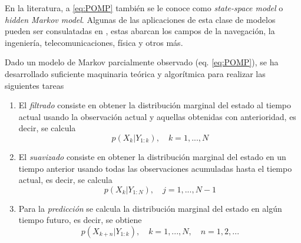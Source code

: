 En la literatura, a \ref{eq:POMP} también se le conoce como \textit{state-space model} 
o \textit{hidden Markov model}. Algunas de las aplicaciones de esta clase de modelos 
pueden ser consulatadas en \cite{sarkkaBayesianFilteringSmoothing2023}, estas 
abarcan los campos de la navegación, la ingeniería, telecomunicaciones, física y 
otros más.

Dado un modelo de Markov parcialmente observado (eq. \ref{eq:POMP}), se ha desarrollado
suficiente maquinaria teórica y algorítmica para realizar las siguientes tareas 
\begin{enumerate}
    \item El \textit{filtrado} consiste en obtener la distribución marginal del 
    estado al tiempo actual usando la observación actual y aquellas 
    obtenidas con anterioridad, es decir, se calcula 
    $$p(X_k|Y_{1:k}),\quad k = 1,...,N$$
    \item El \textit{suavizado} consiste en obtener la distribución marginal 
    del estado en un tiempo anterior usando todas las observaciones acumuladas hasta 
    el tiempo actual, es decir, se calcula 
    $$p(X_k|Y_{1:N}),\quad j = 1,...,N-1$$
    \item Para la \textit{predicción} se calcula la distribución marginal del estado 
    en algún tiempo futuro, es decir, se obtiene 
    $$p(X_{k+n}|Y_{1:k}),\quad k = 1,...,N,\quad n=1,2,...$$
\end{enumerate}




